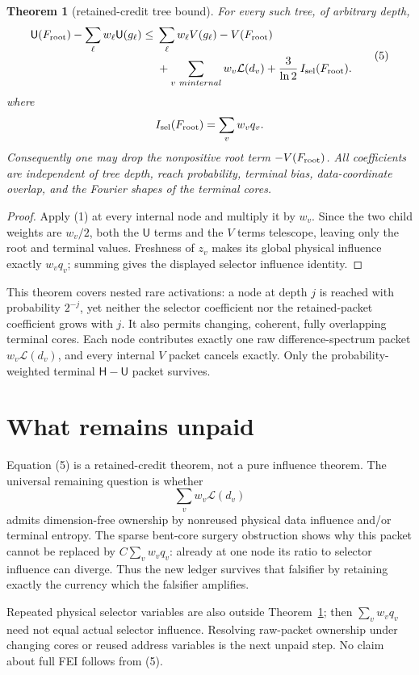 \documentclass[11pt]{article}
\newtheorem{theorem}{Theorem}
\newcommand{\cH}{\mathsf H}
\newcommand{\cU}{\mathsf U}
\begin{document}
\begin{theorem}[retained-credit tree bound]\label{thm:tree}
For every such tree, of arbitrary depth,
\begin{equation}
\begin{split}
 \cU(F_{\rm root})-\sum_{\ell}w_\ell\cU(g_\ell)
 \leq{}&\sum_\ell w_\ell V(g_\ell)-V(F_{\rm root})\\
 &+\sum_{v\ {
m internal}}w_v\mathcal L(d_v)
 +\frac3{\ln2}\,I_{\rm sel}(F_{\rm root}).
\end{split}
\tag{5}
\end{equation}
where
\[
 I_{\rm sel}(F_{\rm root})=\sum_v w_vq_v.
\]
Consequently one may drop the nonpositive root term $-V(F_{\rm root})$.
All coefficients are independent of tree depth, reach probability, terminal
bias, data-coordinate overlap, and the Fourier shapes of the terminal cores.
\end{theorem}

\begin{proof}
Apply (1) at every internal node and multiply it by $w_v$.  Since the two
child weights are $w_v/2$, both the $\cU$ terms and the $V$ terms telescope,
leaving only the root and terminal values.  Freshness of $z_v$ makes its
global physical influence exactly $w_vq_v$; summing gives the displayed
selector influence identity.
\end{proof}

This theorem covers nested rare activations: a node at depth $j$ is reached
with probability $2^{-j}$, yet neither the selector coefficient nor the
retained-packet coefficient grows with $j$.  It also permits changing,
coherent, fully overlapping terminal cores.  Each node contributes exactly
one raw difference-spectrum packet $w_v\mathcal L(d_v)$, and every internal
$V$ packet cancels exactly.  Only the probability-weighted terminal
$\cH-\cU$ packet survives.

\section{What remains unpaid}

Equation (5) is a retained-credit theorem, not a pure influence theorem.
The universal remaining question is whether
\[
 \sum_v w_v\mathcal L(d_v)
\]
admits dimension-free ownership by nonreused physical data influence and/or
terminal entropy.  The sparse bent-core surgery obstruction shows why this
packet cannot be replaced by $C\sum_vw_vq_v$: already at one node its ratio
to selector influence can diverge.  Thus the new ledger survives that
falsifier by retaining exactly the currency which the falsifier amplifies.

Repeated physical selector variables are also outside Theorem~\ref{thm:tree};
then $\sum_vw_vq_v$ need not equal actual selector influence.  Resolving
raw-packet ownership under changing cores or reused address variables is the
next unpaid step.  No claim about full FEI follows from (5).
\end{document}
